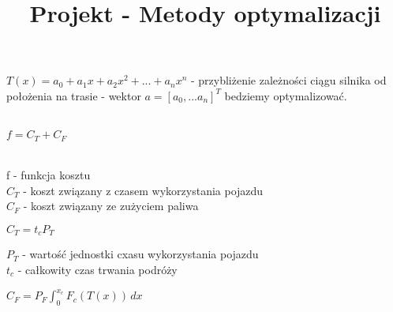 \documentclass[12pt, letterpaper, twoside]{article}
\title{Projekt - Metody optymalizacji}
\author{}
\date{}
\begin{document}
\maketitle 

\( T(x) = a_0 + a_1x + a_2x^2 + ... +a_nx^n \)  - przybliżenie zależno{{\' s}}ci ciągu silnika od położenia na trasie - wektor \(a = [ a_0, ... a_n ]^T\) bedziemy optymalizować. \\\\
\centerline{\( f = C_T + C_F\)} \\
f - funkcja kosztu \\
\(C_T\) - koszt związany z czasem wykorzystania pojazdu \\
\(C_F\) - koszt związany ze zużyciem paliwa \\

\begin{center}
\(C_T = t_cP_T\) \\
\end{center}
\(P_T\) - warto{{\' s}}ć jednostki cxasu wykorzystania pojazdu\\
\(t_c\) - całkowity czas trwania podróży

\begin{center}
\(C_F = P_F \int_{0}^{x_c} F_c(T(x)) \,dx \) \\
\end{center}
\end{document}
